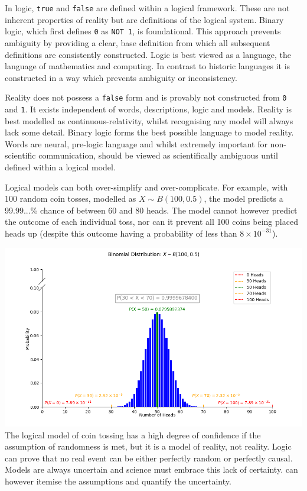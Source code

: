 \documentclass[12pt]{article}
\begin{document}
In logic, \texttt{true} and \texttt{false} are defined within a logical framework. These are not inherent properties of reality but are definitions of the logical system. Binary logic, which first defines \texttt{0} as \texttt{NOT 1}, is foundational. This approach prevents ambiguity by providing a clear, base definition from which all subsequent definitions are consistently constructed. Logic is best viewed as a language, the language of mathematics and computing. In contrast to historic languages it is constructed in a way which prevents ambiguity or inconsistency.

Reality does not possess a \texttt{false} form and is provably not constructed from \texttt{0} and \texttt{1}. It exists independent of words, descriptions, logic and models. Reality is best modelled as continuous-relativity, whilst recognising any model will always lack some detail. Binary logic forms the best possible language to model reality. Words are neural, pre-logic language and whilst extremely important for non-scientific communication, should be viewed as scientifically ambiguous until defined within a logical model.

Logical models can both over-simplify and over-complicate. For example, with 100 random coin tosses, modelled as \( X \sim B(100,0.5) \), the model predicts a 99.99...\% chance of between 60 and 80 heads. The model cannot however predict the outcome of each individual toss, nor can it prevent all 100 coins being placed heads up (despite this outcome having a probability of less than  \( 8 \times 10^{-31} \)).

\includegraphics[width=\textwidth]{binomial.png}
The logical model of coin tossing has a high degree of confidence if the assumption of randomness is met, but it is a model of reality, not reality. Logic can prove that no real event can be either perfectly random or perfectly causal. Models are always uncertain and science must embrace this lack of certainty. \iR{} can however itemise the assumptions and quantify the uncertainty.
\end{document}
